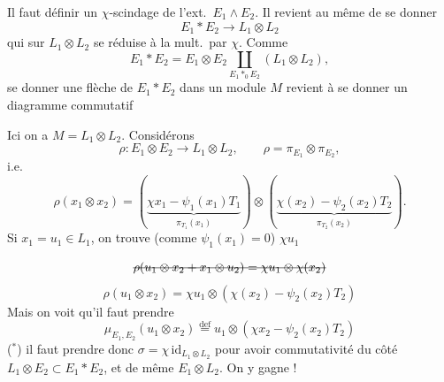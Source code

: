 \documentclass[11pt,a4paper]{article}
\begin{document}

Il faut définir un $\chi$-scindage de l'ext.\ $E_1 \wedge E_2$.
Il revient au même de se donner
\[
  E_1 * E_2 \to L_1 \otimes L_2
\]
qui sur $L_1 \otimes L_2$ se réduise à la mult.\ par $\chi$. Comme
\[
  E_1 * E_2 = E_1 \otimes E_2 \underset{E_1 *_0 E_2}{\amalg} (L_1 \otimes L_2),
\]
se donner une flèche de $E_1 * E_2$ dans un module $M$ revient à se donner un diagramme commutatif


Ici on a $M = L_1 \otimes L_2$. Considérons
\[
  \rho : E_1 \otimes E_2 \to L_1 \otimes L_2, \qquad \rho = \pi_{E_1} \otimes \pi_{E_2},
\]
i.e.
\[
  \rho(x_1 \otimes x_2) = (\underbrace{\chi x_1 - \psi_1(x_1)T_1}_{\pi_{T_1}(x_1)})
  \otimes (\underbrace{\chi(x_2) - \psi_2(x_2)T_2}_{\pi_{T_2}(x_2)}).
\]
Si $x_1 = u_1 \in L_1$, on trouve (comme $\psi_1(x_1) = 0$) $\chi u_1$

\[
  \text{\struck{$\rho(u_1 \otimes x_2 + x_1 \otimes u_2) = \chi u_1 \otimes \chi(x_2)$}}
\]
\[
  \rho(u_1 \otimes x_2) = \chi u_1 \otimes (\chi(x_2) - \psi_2(x_2)T_2)
\]
Mais on voit qu'il faut prendre
\[
  \mu_{E_1,E_2}(u_1 \otimes x_2) \overset{\mathrm{def}}{=} u_1 \otimes (\chi x_2 - \psi_2(x_2)T_2)
\]
(${}^{*}$) il faut prendre donc $\sigma = \chi\,\mathrm{id}_{L_1 \otimes L_2}$ pour avoir commutativité du côté $L_1 \otimes E_2 \subset E_1 * E_2$, et de même $E_1 \otimes L_2$. On y gagne !

\end{document}
